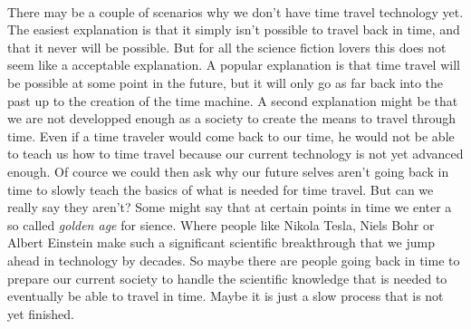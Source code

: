 \paragraph{}
There may be a couple of scenarios why we don't have time travel technology yet. The easiest explanation is that it simply isn't possible to travel back in time, and that it never will be possible. But for all the science fiction lovers this does not seem like a acceptable explanation. A popular explanation is that time travel will be possible at some point in the future, but it will only go as far back into the past up to the creation of the time machine.
A second explanation might be that we are not developped enough as a society to create the means to travel through time. Even if a time traveler would come back to our time, he would not be able to teach us how to time travel because our current technology is not yet advanced enough. Of cource we could then ask why our future selves aren't going back in time to slowly teach the basics of what is needed for time travel. But can we really say they aren't? Some might say that at certain points in time we enter a so called \emph{golden age} for sience. Where people like Nikola Tesla, Niels Bohr or Albert Einstein make such a significant scientific breakthrough that we jump ahead in technology by decades. So maybe there are people going back in time to prepare our current society to handle the scientific knowledge that is needed to eventually be able to travel in time. Maybe it is just a slow process that is not yet finished.


